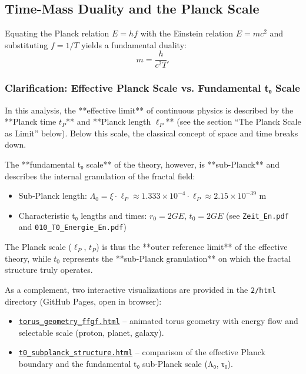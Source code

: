	\subsection{Time-Mass Duality and the Planck Scale}
	Equating the Planck relation \(E = hf\) with the Einstein relation \(E = mc^2\) and substituting \(f = 1/T\) yields a fundamental duality:
	\begin{equation}
		m = \frac{h}{c^2 T}.
		\label{eq:time_mass_duality}
	\end{equation}
	\subsubsection{Clarification: Effective Planck Scale vs. Fundamental t₀ Scale}
	In this analysis, the **effective limit** of continuous physics is described by the **Planck time \( t_P \)** and **Planck length \(\ell_P\)** (see the section ``The Planck Scale as Limit'' below). Below this scale, the classical concept of space and time breaks down.
	
	The **fundamental t₀ scale** of the theory, however, is **sub-Planck** and describes the internal granulation of the fractal field:
	\begin{itemize}
		\item Sub-Planck length: \(\Lambda_0 = \xi \cdot \ell_P \approx 1.333 \times 10^{-4} \cdot \ell_P \approx 2.15 \times 10^{-39} \) m
		\item Characteristic t₀ lengths and times: \( r_0 = 2GE \), \( t_0 = 2GE \) (see \texttt{Zeit\_En.pdf} and \texttt{010\_T0\_Energie\_En.pdf})
	\end{itemize}
	
	The Planck scale (\(\ell_P\), \( t_P \)) is thus the **outer reference limit** of the effective theory, while \( t_0 \) represents the **sub-Planck granulation** on which the fractal structure truly operates.
	
	As a complement, two interactive visualizations are provided in the \texttt{2/html} directory (GitHub Pages, open in browser):
	\begin{itemize}
		\item \href{https://jpascher.github.io/T0-Time-Mass-Duality/2/html/torus_geometry_ffgf.html}{\texttt{torus\_geometry\_ffgf.html}} – animated torus geometry with energy flow and selectable scale (proton, planet, galaxy).
		\item \href{https://jpascher.github.io/T0-Time-Mass-Duality/2/html/t0_subplanck_structure.html}{\texttt{t0\_subplanck\_structure.html}} – comparison of the effective Planck boundary and the fundamental t₀ sub-Planck scale (Λ₀, τ₀).
	\end{itemize}
	
